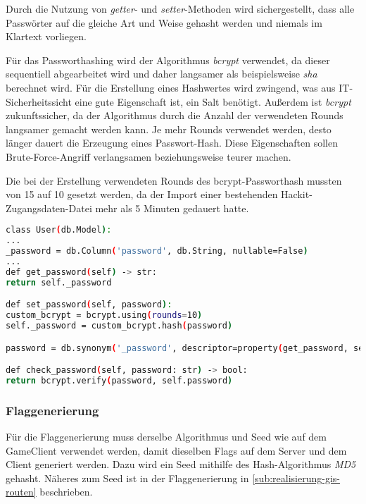 Durch die Nutzung von \textit{getter}- und \textit{setter}-Methoden wird sichergestellt, dass alle Passwörter auf die gleiche Art und Weise gehasht werden und niemals im Klartext vorliegen.

Für das Passworthashing wird der Algorithmus \textit{bcrypt} verwendet, da dieser sequentiell abgearbeitet wird und daher langsamer als beispielsweise  \textit{sha} berechnet wird. Für die Erstellung eines Hashwertes wird zwingend, was aus IT-Sicherheitssicht eine gute Eigenschaft ist, ein Salt benötigt. Außerdem ist \textit{bcrypt} zukunftssicher, da der Algorithmus durch die Anzahl der verwendeten Rounds langsamer gemacht werden kann. Je mehr Rounds verwendet werden, desto länger dauert die Erzeugung eines Passwort-Hash. Diese Eigenschaften sollen Brute-Force-Angriff verlangsamen beziehungsweise teurer machen. \cite{ariasHashingActionUnderstanding2018}

Die bei der Erstellung verwendeten Rounds des bcrypt-Passworthash mussten von 15 auf 10 gesetzt werden, da der Import einer bestehenden Hackit-Zugangsdaten-Datei mehr als 5 Minuten gedauert hatte.

\begin{lstlisting}[language=bash, frame=single, caption={GIS Passwort des Accounts}, captionpos=b, label={lst:gis-orm-user-pw-hash}]
class User(db.Model):
...
_password = db.Column('password', db.String, nullable=False)
...
def get_password(self) -> str:
return self._password

def set_password(self, password):
custom_bcrypt = bcrypt.using(rounds=10)
self._password = custom_bcrypt.hash(password)

password = db.synonym('_password', descriptor=property(get_password, set_password))

def check_password(self, password: str) -> bool:
return bcrypt.verify(password, self.password)
\end{lstlisting}

\subsubsection{Flaggenerierung}\label{subsub:realisierung-gis-flag-hash}
Für die Flaggenerierung muss derselbe Algorithmus und Seed wie auf dem GameClient verwendet werden, damit dieselben Flags auf dem Server und dem Client generiert werden. Dazu wird ein Seed mithilfe des Hash-Algorithmus \textit{MD5} gehasht. Näheres zum Seed ist in der Flaggenerierung in \autoref{sub:realisierung-gis-routen} beschrieben. 

